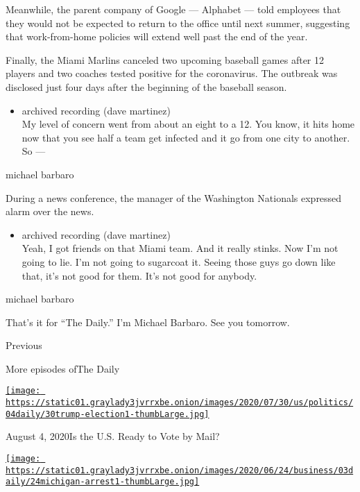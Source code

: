 Meanwhile, the parent company of Google --- Alphabet --- told employees
that they would not be expected to return to the office until next
summer, suggesting that work-from-home policies will extend well past
the end of the year.

Finally, the Miami Marlins canceled two upcoming baseball games after 12
players and two coaches tested positive for the coronavirus. The
outbreak was disclosed just four days after the beginning of the
baseball season.

\begin{itemize}
\tightlist
\item
  archived recording (dave martinez)\\
  My level of concern went from about an eight to a 12. You know, it
  hits home now that you see half a team get infected and it go from one
  city to another. So ---
\end{itemize}

michael barbaro

During a news conference, the manager of the Washington Nationals
expressed alarm over the news.

\begin{itemize}
\tightlist
\item
  archived recording (dave martinez)\\
  Yeah, I got friends on that Miami team. And it really stinks. Now I'm
  not going to lie. I'm not going to sugarcoat it. Seeing those guys go
  down like that, it's not good for them. It's not good for anybody.
\end{itemize}

michael barbaro

That's it for ``The Daily.'' I'm Michael Barbaro. See you tomorrow.

Previous

More episodes ofThe Daily

\href{https://www.nytimes3xbfgragh.onion/2020/08/04/podcasts/the-daily/mail-in-voting-president-trump.html?action=click\&module=audio-series-bar\&region=header\&pgtype=Article}{\texttt{[image: https://static01.graylady3jvrrxbe.onion/images/2020/07/30/us/politics/04daily/30trump-election1-thumbLarge.jpg]}}

August 4, 2020Is the U.S. Ready to Vote by Mail?

\href{https://www.nytimes3xbfgragh.onion/2020/08/03/podcasts/the-daily/algorithmic-justice-racism.html?action=click\&module=audio-series-bar\&region=header\&pgtype=Article}{\texttt{[image: https://static01.graylady3jvrrxbe.onion/images/2020/06/24/business/03daily/24michigan-arrest1-thumbLarge.jpg]}}

